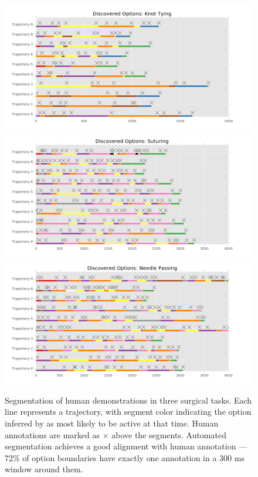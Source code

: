 \begin{figure}[t]
    \centering
    \includegraphics[width=\columnwidth]{ddco-experiments/options-knot-tying.png}
    \includegraphics[width=\columnwidth]{ddco-experiments/options-suturing.png}
    \includegraphics[width=\columnwidth]{ddco-experiments/options-needle-passing.png}
    \caption{Segmentation of human demonstrations in three surgical tasks. Each line represents a trajectory, with segment color indicating the option inferred by \alg as most likely to be active at that time. Human annotations are marked as $\times$ above the segments. Automated segmentation achieves a good alignment with human annotation --- 72\% of option boundaries have exactly one annotation in a 300 ms window around them. \label{surgery-1}}\vspace{-1em}
\end{figure}
